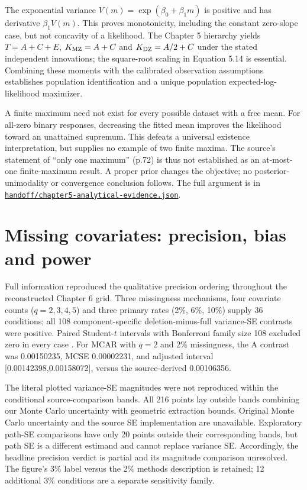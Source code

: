 \documentclass[11pt]{article}
\begin{document}
The exponential variance $V(m)=\exp(\beta_0+\beta_1m)$ is positive and has derivative $\beta_1V(m)$. This proves monotonicity, including the constant zero-slope case, but not concavity of a likelihood. The Chapter 5 hierarchy yields $T=A+C+E$, $K_{\rm MZ}=A+C$ and $K_{\rm DZ}=A/2+C$ under the stated independent innovations; the square-root scaling in Equation 5.14 is essential. Combining these moments with the calibrated observation assumptions establishes population identification and a unique population expected-log-likelihood maximizer.

A finite maximum need not exist for every possible dataset with a free mean. For all-zero binary responses, decreasing the fitted mean improves the likelihood toward an unattained supremum. This defeats a universal existence interpretation, but supplies no example of two finite maxima. The source's statement of ``only one maximum'' (p.72) is thus not established as an at-most-one finite-maximum result. A proper prior changes the objective; no posterior-unimodality or convergence conclusion follows. The full argument is in \href{https://github.com/alectionary/vibe-math/blob/master/formalization/schwabe-psychometric-genetics/handoff/chapter5-analytical-evidence.json}{\nolinkurl{handoff/chapter5-analytical-evidence.json}}.

\section{Missing covariates: precision, bias and power}
Full information reproduced the qualitative precision ordering throughout the reconstructed Chapter 6 grid. Three missingness mechanisms, four covariate counts ($q=2,3,4,5$) and three primary rates (2\%, 6\%, 10\%) supply 36 conditions; all 108 component-specific deletion-minus-full variance-SE contrasts were positive. Paired Student-$t$ intervals with Bonferroni family size 108 excluded zero in every case \citep{dunn1961}. For MCAR with $q=2$ and 2\% missingness, the A contrast was 0.00150235, MCSE 0.00002231, and adjusted interval [0.00142398,0.00158072], versus the source-derived 0.00106356.

The literal plotted variance-SE magnitudes were not reproduced within the conditional source-comparison bands. All 216 points lay outside bands combining our Monte Carlo uncertainty with geometric extraction bounds. Original Monte Carlo uncertainty and the source SE implementation are unavailable. Exploratory path-SE comparisons have only 20 points outside their corresponding bands, but path SE is a different estimand and cannot replace variance SE. Accordingly, the headline precision verdict is partial and its magnitude comparison unresolved. The figure's 3\% label versus the 2\% methods description is retained; 12 additional 3\% conditions are a separate sensitivity family.
\end{document}
